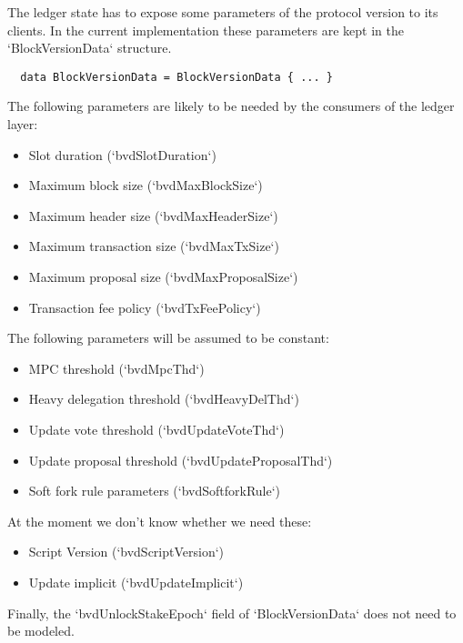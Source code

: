 The ledger state has to expose some parameters of the protocol version to its
clients. In the current implementation these parameters are kept in the
`BlockVersionData` structure.

\begin{lstlisting}
  data BlockVersionData = BlockVersionData { ... }
\end{lstlisting}

The following parameters are likely to be needed by the consumers of the ledger
layer:

\begin{itemize}
\item Slot duration (`bvdSlotDuration`)
\item Maximum block size (`bvdMaxBlockSize`)
\item Maximum header size (`bvdMaxHeaderSize`)
\item Maximum transaction size (`bvdMaxTxSize`)
\item Maximum proposal size (`bvdMaxProposalSize`)
\item Transaction fee policy (`bvdTxFeePolicy`)
\end{itemize}

The following parameters will be assumed to be constant:
\begin{itemize}
\item MPC threshold (`bvdMpcThd`)
\item Heavy delegation threshold (`bvdHeavyDelThd`)
\item Update vote threshold (`bvdUpdateVoteThd`)
\item Update proposal threshold (`bvdUpdateProposalThd`)
\item Soft fork rule parameters (`bvdSoftforkRule`)
\end{itemize}

At the moment we don't know whether we need these:

\begin{itemize}
\item Script Version (`bvdScriptVersion`)
\item Update implicit (`bvdUpdateImplicit`)
\end{itemize}

Finally, the `bvdUnlockStakeEpoch` field of `BlockVersionData` does not need to
be modeled.
